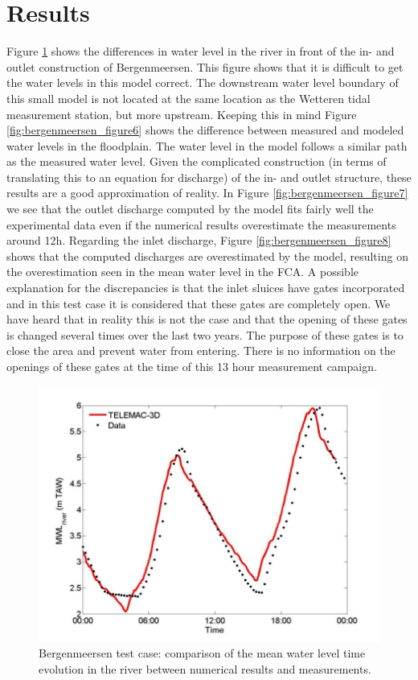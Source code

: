 \section{Results}

Figure \ref{fig:bergenmeersen_figure5} shows the differences in water level in the
river in front of the in- and outlet construction of Bergenmeersen.
This figure shows that it is difficult to get the water levels in this model correct.
The downstream water level boundary of this small model is not located at the same location
as the Wetteren tidal measurement station, but more upstream.
Keeping this in mind Figure \ref{fig:bergenmeersen_figure6} shows the difference between measured
and modeled water levels in the floodplain.
The water level in the model follows a similar path as the measured water level.
Given the complicated construction (in terms of translating this to an equation for discharge)
of the in- and outlet structure, these results are a good approximation of reality.
In Figure \ref{fig:bergenmeersen_figure7} we see that the outlet discharge computed by the model fits
fairly well the experimental data even if the numerical results overestimate the measurements around 12h.
Regarding the inlet discharge, Figure \ref{fig:bergenmeersen_figure8} shows that the computed discharges are
overestimated by the model, resulting on the overestimation seen in the mean water level in the FCA.
A possible explanation for the discrepancies is that the inlet sluices have gates incorporated
and in this test case it is considered that these gates are completely open.
We have heard that in reality this is not the case and that the opening of these gates is
changed several times over the last two years.
The purpose of these gates is to close the area and prevent water from entering.
There is no information on the openings of these gates at the time of this 13 hour measurement campaign.

\begin{figure}[H]
\begin{center}
  \includegraphics[scale=1]{img/figure5.png}
\end{center}
\caption{Bergenmeersen test case: comparison of the mean water level time evolution in the
river between numerical results and measurements.}
\label{fig:bergenmeersen_figure5}
\end{figure}


